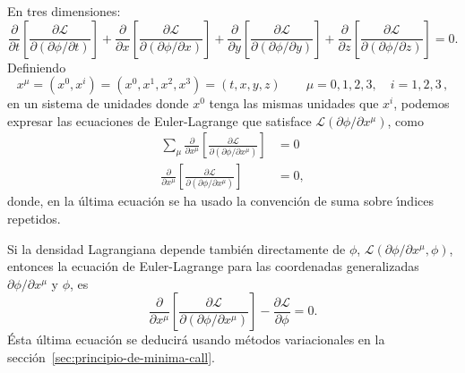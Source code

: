 En tres dimensiones:
\begin{equation}
  \label{eq:eelcalls1m}
\frac{\partial}{\partial t}
  \left[
    \frac{\partial\mathcal{L}}{\partial
      (\partial\phi/\partial t)}
  \right]+\frac{\partial}{\partial x}
  \left[
    \frac{\partial\mathcal{L}}{\partial
      (\partial\phi/\partial x)}
  \right]+\frac{\partial}{\partial y}
  \left[
    \frac{\partial\mathcal{L}}{\partial
      (\partial\phi/\partial y)}
  \right]+\frac{\partial}{\partial z}
  \left[
    \frac{\partial\mathcal{L}}{\partial
      (\partial\phi/\partial z)}
  \right]=0.
\end{equation}
Definiendo
\begin{equation}
  \label{eq:xmu}
  x^\mu=(x^0,x^i)=(x^0,x^1,x^2,x^3)=(t,x,y,z) \qquad \mu=0,1,2,3,\quad i=1,2,3\,,
\end{equation}
en un sistema de unidades donde $x^0$ tenga las mismas unidades que
$x^i$, podemos expresar las ecuaciones de Euler-Lagrange que satisface
$\mathcal{L}(\partial\phi/\partial x^\mu)$, como
\begin{align*}
 \sum_\mu\frac{\partial}{\partial x^\mu}
  \left[
    \frac{\partial\mathcal{L}}{\partial
      (\partial\phi/\partial x^\mu)}
  \right]&=0\\
 \frac{\partial}{\partial x^\mu}
  \left[
    \frac{\partial\mathcal{L}}{\partial
      (\partial\phi/\partial x^\mu)}
  \right]&=0,
\end{align*}
donde, en la \'ultima ecuaci\'on se ha usado la convenci\'on de suma sobre
\'\i ndices repetidos. 

Si la densidad Lagrangiana depende tambi\'en directamente de $\phi$,
$\mathcal{L}(\partial\phi/\partial x^\mu,\phi)$, entonces la ecuaci\'on de Euler-Lagrange para
las coordenadas generalizadas  $\partial\phi/\partial x^\mu$ y $\phi$, es
\begin{equation}
\label{eq:eelcallf}
 \frac{\partial}{\partial x^\mu}
  \left[
    \frac{\partial\mathcal{L}}{\partial
      (\partial\phi/\partial x^\mu)}
  \right]-\frac{\partial\mathcal{L}}{\partial\phi}=0.
\end{equation}
\'Esta \'ultima ecuaci\'on se deducir\'a usando m\'etodos variacionales en la
secci\'on~\ref{sec:principio-de-minima-call}.

